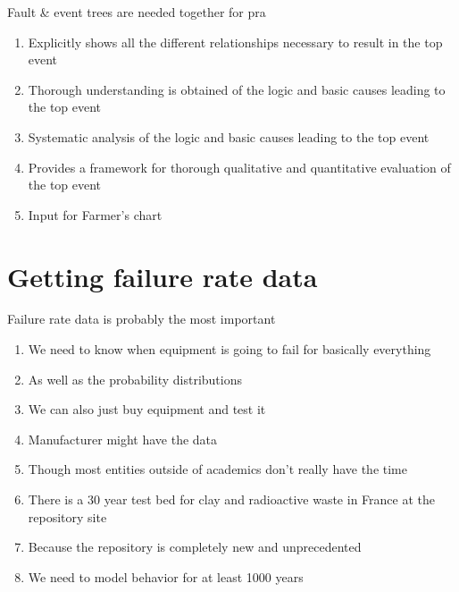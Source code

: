 \documentclass[aspectratio=1610,pdftex,dvipsnames,compress,xcolor={dvipsnames}]{beamer}
\newcommand{\acs}{\acrshort} %
\begin{document}
\begin{frame}{Fault \& event trees are needed together for \acs{pra}}
    \begin{enumerate}[series=outerlist,topsep=0pt,itemsep=21pt,leftmargin=*,label=(\arabic*)]
        \item[]Explicitly shows all the different relationships necessary to result in the top event
        \item[]Thorough understanding is obtained of the logic and basic causes leading to the top event
        \item[]Systematic analysis of the logic and basic causes leading to the top event
        \item[]Provides a framework for thorough qualitative and quantitative evaluation of the top event
        \item[]Input for Farmer's chart
    \end{enumerate}
\end{frame}


\section{Getting failure rate data}


\addtocounter{framenumber}{-1}
\begin{frame}{Failure rate data is probably the most important}
    \begin{enumerate}[series=outerlist,topsep=0pt,itemsep=7pt,leftmargin=*,label=(\arabic*)]
        \item[]We need to know when equipment is going to fail for basically everything
        \item[]As well as the probability distributions  
        \item[]We can also just buy equipment and test it  
        \item[]Manufacturer might have the data
        \item[]Though most entities outside of academics don't really have the time
        \item[]There is a 30 year test bed for clay and radioactive waste in France at the repository site 
        \item[]Because the repository is completely new and unprecedented 
        \item[]We need to model behavior for at least 1000 years
    \end{enumerate}
\end{frame}
\end{document}
